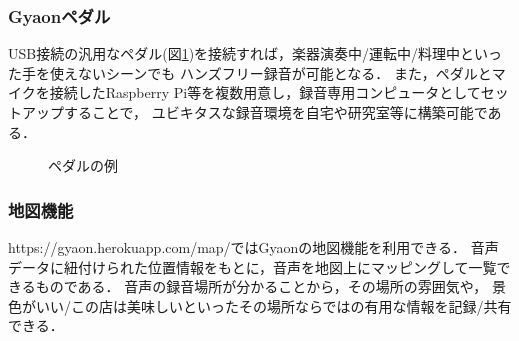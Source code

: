 \subsubsection{Gyaonペダル}
USB接続の汎用なペダル(図\ref{pedal})を接続すれば，楽器演奏中/運転中/料理中といった手を使えないシーンでも
ハンズフリー録音が可能となる．
また，ペダルとマイクを接続したRaspberry Pi等を複数用意し，録音専用コンピュータとしてセットアップすることで，
ユビキタスな録音環境を自宅や研究室等に構築可能である．


\begin{figure}[H]
\centering
{}
\caption{ペダルの例}
\label{pedal}
\end{figure}


\subsubsection{地図機能}
https://gyaon.herokuapp.com/map/ではGyaonの地図機能を利用できる．
音声データに紐付けられた位置情報をもとに，音声を地図上にマッピングして一覧できるものである．
音声の録音場所が分かることから，その場所の雰囲気や，
景色がいい/この店は美味しいといったその場所ならではの有用な情報を記録/共有できる．

